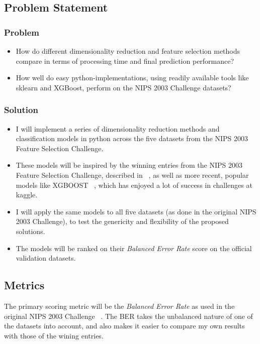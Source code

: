 \documentclass[12pt]{article}
\begin{document}
\subsection{Problem Statement}

\subsubsection{Problem}
\begin{itemize}
\item How do different dimensionality reduction and feature selection methods compare in terms of processing time and final prediction performance?
\item How well do easy python-implementations, using readily available tools like sklearn and XGBoost, perform on the NIPS 2003 Challenge datasets?
\end{itemize}

\subsubsection{Solution}
\begin{itemize}
\item I will implement a series of dimensionality reduction methods and classification models in python across the five datasets from the NIPS 2003 Feature Selection Challenge. 
\item These models will be inspired by the winning entries from the NIPS 2003 Feature Selection Challenge, described in ~\cite{nips03book}, as well as more recent, popular models like XGBOOST ~\cite{xgboostcite}, which has enjoyed a lot of success in challenges at kaggle.
\item I will apply the same models to all five datasets (as done in the original NIPS 2003 Challenge), to test the genericity and flexibility of the proposed solutions.
\item The models will be ranked on their \emph{Balanced Error Rate} score on the official validation datasets.
\end{itemize}

\subsection{Metrics}

The primary scoring metric will be the \emph{Balanced Error Rate} as used in the original NIPS 2003 Challenge ~\cite{nips03evaluation}. The BER takes the unbalanced nature of one of the datasets into account, and also makes it easier to compare my own results with those of the wining entries. 
\end{document}
